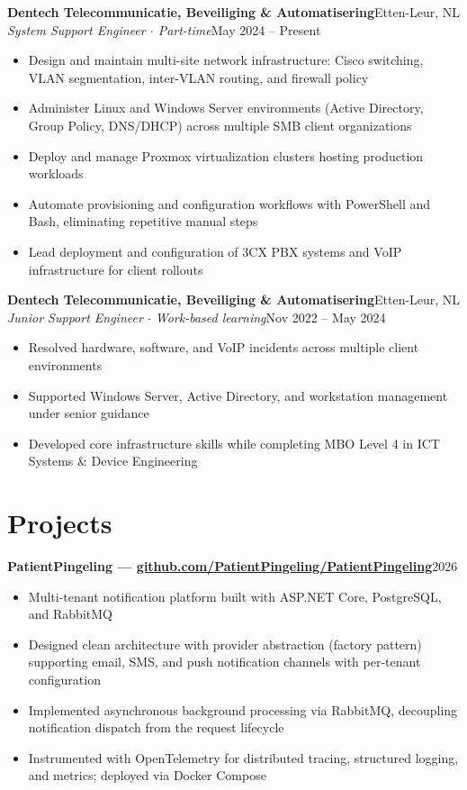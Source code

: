 \documentclass[a4paper,10pt]{article}
\newcommand{\cventry}[4]{%
  {\textbf{#1}}\hfill{\small\color{lightgray}#2}\\
  {\textit{#3}}\hfill{\small\color{lightgray}#4}\vspace{2pt}%
}
\newcommand{\cvsimple}[2]{%
  {\textbf{#1}}\hfill{\small\color{lightgray}#2}\vspace{1pt}%
}
\begin{document}
\cventry{Dentech Telecommunicatie, Beveiliging \& Automatisering}{Etten-Leur, NL}%
        {System Support Engineer $\cdot$ Part-time}{May 2024 -- Present}
\begin{itemize}
  \item Design and maintain multi-site network infrastructure: Cisco switching, VLAN segmentation, inter-VLAN routing, and firewall policy
  \item Administer Linux and Windows Server environments (Active Directory, Group Policy, DNS/DHCP) across multiple SMB client organizations
  \item Deploy and manage Proxmox virtualization clusters hosting production workloads
  \item Automate provisioning and configuration workflows with PowerShell and Bash, eliminating repetitive manual steps
  \item Lead deployment and configuration of 3CX PBX systems and VoIP infrastructure for client rollouts
\end{itemize}

\vspace{4pt}

\cventry{Dentech Telecommunicatie, Beveiliging \& Automatisering}{Etten-Leur, NL}%
        {Junior Support Engineer $\cdot$ Work-based learning}{Nov 2022 -- May 2024}
\begin{itemize}
  \item Resolved hardware, software, and VoIP incidents across multiple client environments
  \item Supported Windows Server, Active Directory, and workstation management under senior guidance
  \item Developed core infrastructure skills while completing MBO Level 4 in ICT Systems \& Device Engineering
\end{itemize}

\section{Projects}

\cvsimple{PatientPingeling \textnormal{\small\color{lightgray}--- \href{https://github.com/PatientPingeling/PatientPingeling}{github.com/PatientPingeling/PatientPingeling}}}{2026}
\begin{itemize}
  \item Multi-tenant notification platform built with ASP.NET Core, PostgreSQL, and RabbitMQ
  \item Designed clean architecture with provider abstraction (factory pattern) supporting email, SMS, and push notification channels with per-tenant configuration
  \item Implemented asynchronous background processing via RabbitMQ, decoupling notification dispatch from the request lifecycle
  \item Instrumented with OpenTelemetry for distributed tracing, structured logging, and metrics; deployed via Docker Compose
\end{itemize}
\end{document}
